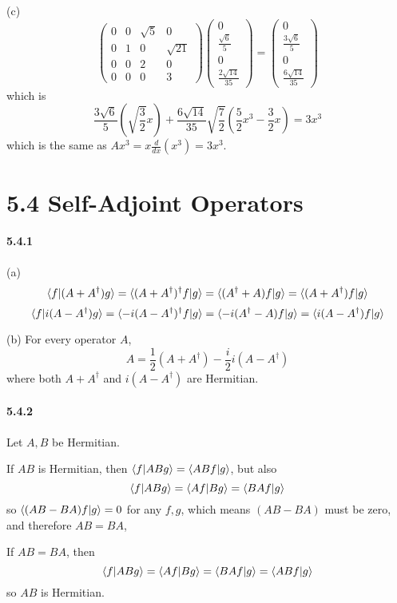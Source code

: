 \documentclass[a4paper]{article}
\begin{document}
(c)
\renewcommand{\arraystretch}{1.5}
\[
\begin{pmatrix}
0&0&\sqrt{5}&0\\
0&1&0&\sqrt{21}\\
0&0&2&0\\
0&0&0&3
\end{pmatrix}
\begin{pmatrix}
0\\\frac{\sqrt{6}}{5}\\0\\\frac{2 \sqrt{14}}{35}
\end{pmatrix}=
\begin{pmatrix}
0\\\frac{3\sqrt{6}}{5}\\0\\\frac{6\sqrt{14}}{35}
\end{pmatrix}
\]
which is 
\[
\frac{3\sqrt{6}}{5}(\sqrt{\frac{3}{2}}x)+\frac{6\sqrt{14}}{35}\sqrt{\frac{7}{2}}(\frac{5}{2}x^3-\frac{3}{2}x)=3x^3
\]
which is the same as $Ax^3=x\frac{d}{dx}(x^3)=3x^3$.

\section*{5.4 Self-Adjoint Operators}

\paragraph{5.4.1}
(a) 
\[
\langle f|(A+A^\dagger)g\rangle=\langle(A+A^\dagger)^\dagger f|g\rangle=\langle(A^\dagger+A)f|g\rangle=\langle(A+A^\dagger)f|g\rangle
\]
\[
\langle f|i(A-A^\dagger)g\rangle=\langle-i(A-A^\dagger)^\dagger f|g\rangle=\langle-i(A^\dagger-A)f|g\rangle=\langle i(A-A^\dagger)f|g\rangle
\]

(b)
For every operator $A$,
\[
A=\frac{1}{2}(A+A^\dagger)-\frac{i}{2}i(A-A^\dagger)
\]
where both $A+A^\dagger$ and $i(A-A^\dagger)$ are Hermitian.

\paragraph{5.4.2}
Let $A,B$ be Hermitian. 

If $AB$ is Hermitian, then $\langle f|ABg\rangle=\langle ABf|g\rangle$, but also
\[
\langle f|ABg\rangle=\langle Af|Bg\rangle=\langle BAf|g\rangle
\]
so $\langle(AB-BA)f|g\rangle=0$ for any $f,g$, which means $(AB-BA)$ must be zero, and therefore $AB=BA$, 

If $AB=BA$, then 
\[
\langle f|ABg\rangle=\langle Af|Bg\rangle=\langle BAf|g\rangle=\langle ABf|g\rangle
\]
so $AB$ is Hermitian.
\end{document}
